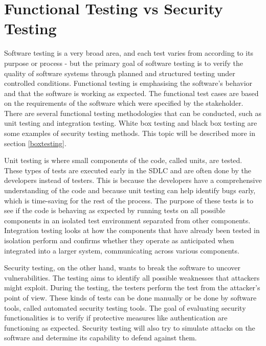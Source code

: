 \section{Functional Testing vs Security Testing}
Software testing is a very broad area, and each test varies from according to its purpose or process - but the primary goal of software testing is to verify the quality of software systems through planned and structured testing under controlled conditions. Functional testing is emphasising the software's behavior and that the software is working as expected. The functional test cases are based on the requirements of the software which were specified by the stakeholder. There are several functional testing methodologies that can be conducted, such as unit testing and integration testing. White box testing and black box testing are some examples of security testing methods. This topic will be described more in section \ref{boxtesting}. 
\cite{difftesting} 

Unit testing is where small components of the code, called units, are tested. These types of tests are executed early in the SDLC and are often done by the developers instead of testers. This is because the developers have a comprehensive understanding of the code and because unit testing can help identify bugs early, which is time-saving for the rest of the process. The purpose of these tests is to see if the code is behaving as expected by running tests on all possible components in an isolated test environment separated from other components. Integration testing looks at how the components that have already been tested in isolation perform and confirms whether they operate as anticipated when integrated into a larger system, communicating across various components.\cite{unitvsintergration}

Security testing, on the other hand, wants to break the software to uncover vulnerabilities. The testing aims to identify all possible weaknesses that attackers might exploit. During the testing, the testers perform the test from the attacker's point of view. These kinds of tests can be done manually or be done by software tools, called automated security testing tools. The goal of evaluating security functionalities is to verify if protective measures like authentication are functioning as expected. Security testing will also try to simulate attacks on the software and determine its capability to defend against them.\cite{whysectest}





